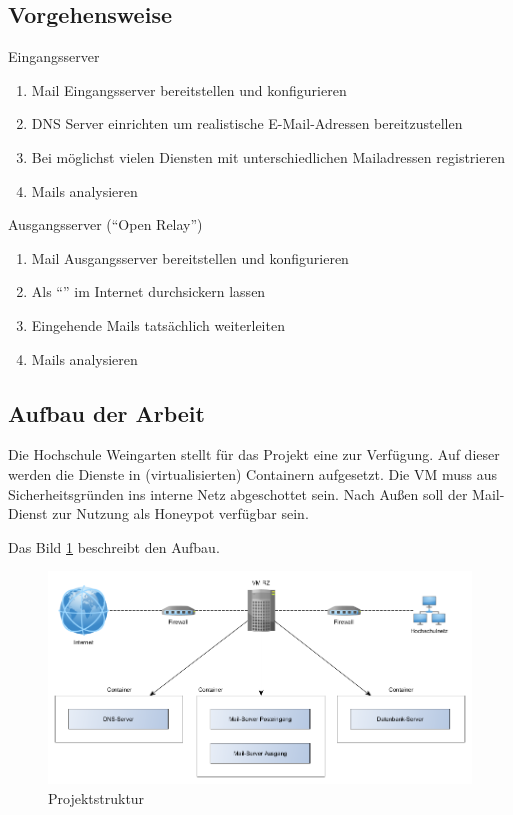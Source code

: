 \documentclass[a4paper,11pt,singlespacing]{article}
\begin{document}
	\subsection{Vorgehensweise}\label{sec:EinleitungVorgehensweise}
		Eingangsserver
		\begin{enumerate}
		\item Mail Eingangsserver bereitstellen und konfigurieren
		\item DNS Server einrichten um realistische E-Mail-Adressen bereitzustellen
		\item Bei möglichst vielen Diensten mit unterschiedlichen Mailadressen registrieren
		\item Mails analysieren
		\end{enumerate}

		Ausgangsserver ("`Open Relay"') %
		\begin{enumerate}
		\item Mail Ausgangsserver bereitstellen und konfigurieren
		\item Als "`"' im Internet durchsickern lassen
		\item Eingehende Mails tatsächlich weiterleiten
		\item Mails analysieren
		\end{enumerate}

	\subsection{Aufbau der Arbeit}\label{sec:EinleitungAufbau}
		Die Hochschule Weingarten stellt für das Projekt eine  zur Verfügung.
		Auf dieser werden die Dienste in (virtualisierten) Containern aufgesetzt. %
		Die VM muss aus Sicherheitsgründen ins interne Netz abgeschottet sein.
		Nach Außen soll der Mail-Dienst zur Nutzung als Honeypot verfügbar sein.

		Das Bild \ref{fig:Hierarchy} beschreibt den Aufbau.

		\begin{figure}
		\includegraphics[width=\linewidth]{2-Hierarchy.png}
		\caption{Projektstruktur}
		\label{fig:Hierarchy}
		\end{figure}
\end{document}
